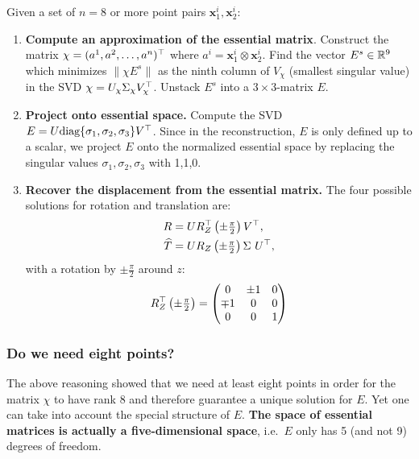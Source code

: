 Given a set of $n=8$ or more point pairs $\bm{x}_1^i, \bm{x}_2^i$:
\begin{enumerate}
	\item \textbf{Compute an approximation of the essential matrix}.
		Construct the matrix $\chi = (a^1, a^2, \ldots, a^n)^{\top}$
		where $a^i = \bm{x}_1^i \otimes \bm{x}_2^i$.
		Find the vector $E^s \in \mathbb{R}^9$ which minimizes $\|\chi E^s\|$
		as the ninth column of $V_{\chi}$ (smallest singular value) in the SVD
		$\chi = U_{\chi} \Sigma_{\chi} V_{\chi} ^{\top}$.
		Unstack $E^s$ into a $3 \times 3$-matrix $E$.

	\item \textbf{Project onto essential space.}
		Compute the SVD
		$E = U \text{diag} \{ \sigma_1, \sigma_2, \sigma_3 \} V^{\top}$.
		Since in the reconstruction, $E$ is only defined up to a scalar,
		we project $E$ onto the normalized essential space by replacing
		the singular values $\sigma_1, \sigma_2, \sigma_3$ with 1,1,0.

	\item \textbf{Recover the displacement from the essential matrix.}
		The four possible solutions for rotation and translation are:
		\begin{align*}
			R &= U R_Z^{\top} \left( {\textstyle \pm \frac{\pi}{2}} \right) V^{\top}, \\
			\widehat{T} &= U R_Z \left( {\textstyle \pm \frac{\pi}{2}} \right) \Sigma\ U^{\top},
		\end{align*}
		with a rotation by $\pm \frac{\pi}{2}$ around $z$:
		\[
			R_Z^{\top} \left( {\textstyle \pm \frac{\pi}{2}} \right)
				= \begin{pmatrix}
					0 & \pm 1 & 0 \\
					\mp 1 & 0 & 0 \\
					0 & 0 & 1
				\end{pmatrix}
		\]
\end{enumerate}


\subsubsection*{Do we need eight points?}%
\label{ssub:do_we_need_eight_points}


The above reasoning showed that we need at least eight points
in order for the matrix $\chi$ to have rank $8$ and therefore
guarantee a unique solution for $E$.
Yet one can take into account the special structure of $E$.
\textbf{The space of essential matrices is actually a five-dimensional space},
i.e.\ $E$ only has 5 (and not 9) degrees of freedom.\\

